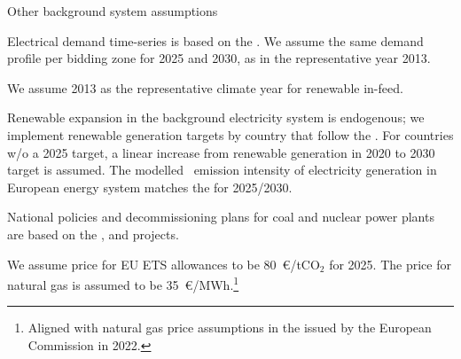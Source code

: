 \begin{frame}{Other background system assumptions}

\begin{itemize}
  {\footnotesize 
\item Electrical demand time-series is based on the 
. 
We assume the same demand profile per bidding zone for 2025 and 2030, as in the representative year 2013. 
\item We assume 2013 as the representative climate year for renewable in-feed.
\item Renewable expansion in the background electricity system is endogenous; we implement renewable generation targets by country that follow the . For countries w/o a 2025 target, a linear increase from renewable generation in 2020 to 2030 target is assumed. The modelled \co~emission intensity of electricity generation in European energy system matches the  for 2025/2030.
\item  National policies and decommissioning plans for coal and nuclear 
power plants are based on the 
, 
and  projects.
\item We assume price for EU ETS allowances to be 80~\euro/tCO$_2$ for 2025.
The price for natural gas is assumed to be 35~\euro/MWh.\footnote{{\scriptsize Aligned with natural gas price assumptions in the 
issued by the European Commission in 2022.}}
}
\vspace{0.2cm}
\end{itemize}

\end{frame}


